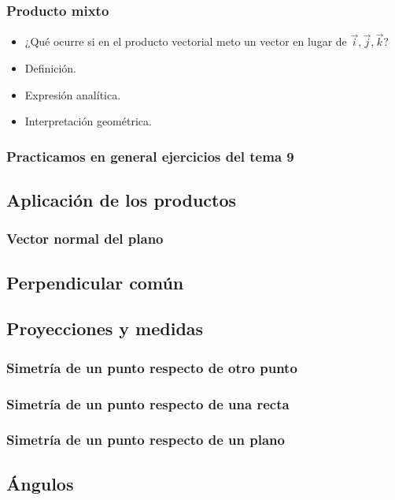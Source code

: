 \subsubsection{Producto mixto}

\begin{itemize}
  \item ¿Qué ocurre si en el producto vectorial meto un vector en lugar de $\vec{i},\vec{j},\vec{k}$?
  \item Definición.
  \item Expresión analítica.
  \item Interpretación geométrica. 
\end{itemize}

\subsubsection{Practicamos en general ejercicios del tema 9}

\subsection{Aplicación de los productos}

\subsubsection{Vector normal del plano}
\subsection{Perpendicular común}

\subsection{Proyecciones y medidas}
\subsubsection{Simetría de un punto respecto de otro punto}
\subsubsection{Simetría de un punto respecto de una recta}
\subsubsection{Simetría de un punto respecto de un plano}

\newpage
\subsection{Ángulos}
